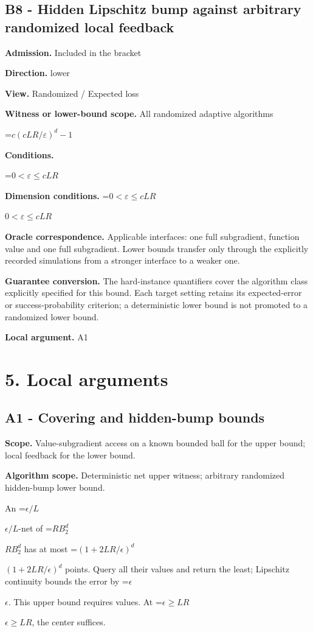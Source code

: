 \documentclass[10pt,a4paper]{article}
\newcommand{\AtlasMath}[1]{\par\begingroup\centering\setbox0=\hbox{$\displaystyle #1$}\ifdim\wd0>1.4\linewidth\typeout{ATLAS WIDE FORMULA: \the\wd0}\fi\ifdim\wd0>\linewidth\resizebox{\linewidth}{!}{\box0}\else\box0\fi\par\endgroup}
\newcommand{\AtlasInlineMath}[1]{\begingroup\setbox0=\hbox{$#1$}\ifdim\wd0>.4\linewidth\endgroup\AtlasMath{#1}\else\endgroup$#1$\fi}
\begin{document}
\subsection{B8 - Hidden Lipschitz bump against arbitrary randomized local feedback}
\textbf{Admission.} Included in the bracket

\textbf{Direction.} lower

\textbf{View.} Randomized / Expected loss

\textbf{Witness or lower-bound scope.} All randomized adaptive algorithms

\AtlasMath{c(cLR/\varepsilon)^d-1}
\textbf{Conditions.} 
\AtlasMath{0<\varepsilon\le cLR}


\textbf{Dimension conditions.} \AtlasInlineMath{0<\varepsilon\le cLR}

\textbf{Oracle correspondence.} Applicable interfaces: one full subgradient, function value and one full subgradient. Lower bounds transfer only through the explicitly recorded simulations from a stronger interface to a weaker one.

\textbf{Guarantee conversion.} The hard-instance quantifiers cover the algorithm class explicitly specified for this bound. Each target setting retains its expected-error or success-probability criterion; a deterministic lower bound is not promoted to a randomized lower bound.

\textbf{Local argument.} A1

\section{5. Local arguments}
\subsection{A1 - Covering and hidden-bump bounds}
\textbf{Scope.} Value-subgradient access on a known bounded ball for the upper bound; local feedback for the lower bound.

\textbf{Algorithm scope.} Deterministic net upper witness; arbitrary randomized hidden-bump lower bound.

An \AtlasInlineMath{\epsilon/L}-net of \AtlasInlineMath{RB_2^d} has at most \AtlasInlineMath{(1+2LR/\epsilon)^d} points. Query all their values and return the least; Lipschitz continuity bounds the error by \AtlasInlineMath{\epsilon}. This upper bound requires values. At \AtlasInlineMath{\epsilon\ge LR}, the center suffices.
\end{document}
